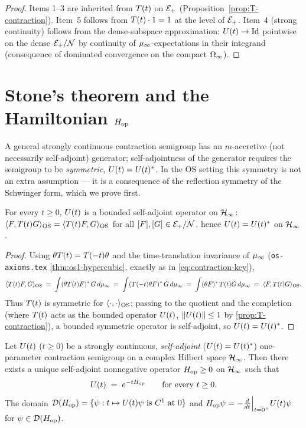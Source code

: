 \begin{proof}
Items 1--3 are inherited from $T(t)$ on $\mathcal{E}_+$
(Proposition~\ref{prop:T-contraction}).  Item~5 follows from
$T(t) \cdot 1 = 1$ at the level of $\mathcal{E}_+$.  Item~4 (strong
continuity) follows from the dense-subspace approximation:
$U(t) \to \mathrm{Id}$ pointwise on the dense $\mathcal{E}_+ / \mathcal{N}$ by
continuity of $\mu_\infty$-expectations in their integrand
(consequence of dominated convergence on the compact $\Omega_\infty$).
\end{proof}

\section{Stone's theorem and the Hamiltonian $H_{\mathrm{op}}$}
\label{sec:stone}

A general strongly continuous contraction semigroup has an
$m$-accretive (not necessarily self-adjoint) generator; self-adjointness
of the generator requires the semigroup to be \emph{symmetric},
$U(t) = U(t)^*$.  In the OS setting this symmetry is not an extra
assumption --- it is a consequence of the reflection symmetry of the
Schwinger form, which we prove first.

\begin{proposition}
\label{prop:U-symmetric}
For every $t \ge 0$, $U(t)$ is a bounded self-adjoint operator on
$\mathcal{H}_\infty$: $\langle F, T(t) G \rangle_{\mathrm{OS}} = \langle T(t) F, G \rangle_{\mathrm{OS}}$ for all
$[F], [G] \in \mathcal{E}_+/\mathcal{N}$, hence $U(t) = U(t)^*$ on $\mathcal{H}_\infty$.
\end{proposition}

\begin{proof}
Using $\theta T(t) = T(-t)\theta$ and the time-translation invariance of
$\mu_\infty$ (\texttt{os-axioms.tex} \cref{thm:os1-hypercubic}, exactly as
in \eqref{eq:contraction-key}),
\begin{equation*}
  \langle T(t) F, G \rangle_{\mathrm{OS}}
  \;=\; \int (\theta T(t) F)^*\, G \, d\mu_\infty
  \;=\; \int (T(-t)\theta F)^*\, G \, d\mu_\infty
  \;=\; \int (\theta F)^*\, T(t) G \, d\mu_\infty
  \;=\; \langle F, T(t) G \rangle_{\mathrm{OS}}.
\end{equation*}
Thus $T(t)$ is symmetric for $\langle \cdot, \cdot \rangle_{\mathrm{OS}}$; passing to the
quotient and the completion (where $T(t)$ acts as the bounded operator
$U(t)$, $\|U(t)\| \le 1$ by \cref{prop:T-contraction}), a bounded
symmetric operator is self-adjoint, so $U(t) = U(t)^*$.
\end{proof}

\begin{theorem}
\label{thm:stone-semigroup}
Let $U(t)$ ($t \ge 0$) be a strongly continuous, \emph{self-adjoint}
($U(t) = U(t)^*$) one-parameter contraction semigroup on a complex
Hilbert space $\mathcal{H}_\infty$.  Then there exists a unique self-adjoint
nonnegative operator $H_{\mathrm{op}} \ge 0$ on $\mathcal{H}_\infty$ such that
\begin{equation*}
  U(t) \;=\; e^{-t H_{\mathrm{op}}} \qquad \text{for every } t \ge 0.
\end{equation*}
The domain $\mathcal{D}(H_{\mathrm{op}}) = \{ \psi : t \mapsto U(t) \psi \text{ is}\ C^1 \text{ at } 0 \}$
and $H_{\mathrm{op}} \psi = -\frac{d}{dt}\Big|_{t=0^+} U(t) \psi$ for $\psi \in \mathcal{D}(H_{\mathrm{op}})$.
\end{theorem}

